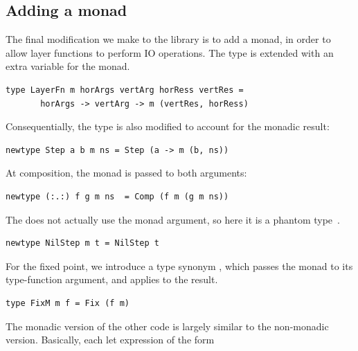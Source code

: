 \documentclass[preprint,natbib]{sigplanconf}
\begin{document}
%																
\subsection{Adding a monad}


The final modification we make to the library is to add a monad, in order to allow layer functions to perform IO operations. The type  is extended with an extra variable  for the monad.

\begin{small}
\begin{verbatim}
type LayerFn m horArgs vertArg horRess vertRes =
       horArgs -> vertArg -> m (vertRes, horRess)
\end{verbatim}
\end{small}

Consequentially, the  type is also modified to account for the monadic result:

\begin{small}
\begin{verbatim}
newtype Step a b m ns = Step (a -> m (b, ns))
\end{verbatim}
\end{small}

At composition, the monad is passed to both arguments:

\begin{small}
\begin{verbatim}
newtype (:.:) f g m ns  = Comp (f m (g m ns))
\end{verbatim}
\end{small}

The  does not actually use the monad argument, so here it is a phantom type~\cite{leijen99dsecs}.

\begin{small}
\begin{verbatim}
newtype NilStep m t = NilStep t
\end{verbatim}
\end{small}

For the fixed point, we introduce a type synonym , which passes the monad to its type-function argument, and applies  to the result.

\begin{small}
\begin{verbatim}
type FixM m f = Fix (f m)
\end{verbatim}
\end{small}

The monadic version of the other code is largely similar to the non-monadic version. Basically, each let expression of the form
\end{document}
